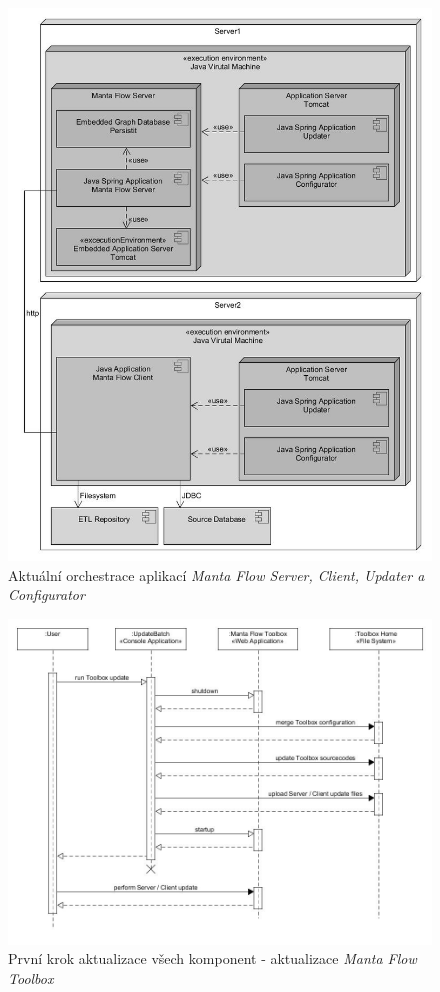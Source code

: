 \documentclass[11pt,twoside,a4paper]{book}
\begin{document}
\begin{figure}
\begin{center}
\includegraphics[width=14cm]{figures/deployment_1}
\caption{Aktuální orchestrace aplikací \textit{Manta Flow Server, Client, Updater a Configurator}}
\label{fig:ana-deployment}
\end{center}
\end{figure}

\begin{figure}
\begin{center}
\includegraphics[width=1\linewidth]{figures/update_toolbox_seq}
\caption{První krok aktualizace všech komponent - aktualizace \textit{Manta Flow Toolbox}}
\label{fig:des-upd_toolbox}
\end{center}
\end{figure}
\end{document}
